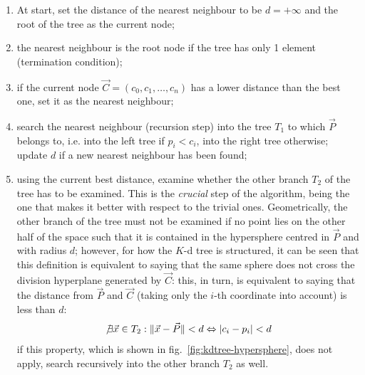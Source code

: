 \begin{enumerate}
  \item{At start, set the distance of the nearest neighbour to be $d=+\infty$
    and the root of the tree as the current node;}
  \item{the nearest neighbour is the root node if the tree has only 1 element
    (termination condition);}
  \item{if the current node $\vec{C}=\left(c_0,c_1,\dots,c_n\right)$ has a lower distance than the best one, set it as
    the nearest neighbour;}
  \item{search the nearest neighbour (recursion step) into the tree $T_1$ to which $\vec{P}$
      belongs to, i.e. into the left tree if $p_i < c_i$, into the right tree
    otherwise; update $d$ if a new nearest neighbour has been found;}
  \item{using the current best distance, examine whether the other branch $T_2$ of
      the tree has to be examined. This is the \emph{crucial} step of the
      algorithm, being the one that makes it better with respect to the trivial
    ones. Geometrically, the other branch of the tree must not be examined if no
    point lies on the other half of the space such that it is contained in the
    hypersphere centred in $\vec{P}$ and with radius $d$; however, for how the $K$-d
    tree is structured, it can be seen that this definition is equivalent to
    saying that the same sphere does not cross the division hyperplane generated
    by $\vec{C}$: this, in turn, is equivalent to saying that the distance from $\vec{P}$
    and $\vec{C}$ (taking only the $i$-th coordinate into account) is less than $d$:
    \begin{equation}
      \not \exists \vec{x} \in T_2 : \lVert \vec{x}-\vec{P} \rVert < d
      \Leftrightarrow \lvert c_i-p_i \rvert < d
    \end{equation}
    if this property, which is shown in fig.~\ref{fig:kdtree-hypersphere}, does not apply, search recursively into the other branch
  $T_2$ as well.}
\end{enumerate}

